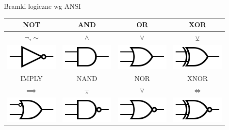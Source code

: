 \begin{frame}{Bramki logiczne wg ANSI}
    \begin{table}
        \centering
        \begin{tabular}{|c|c|c|c|}
            \hline
            NOT & AND & OR & XOR \\
            \hline
            $\lnot$, $\sim$ & $\land$ & $\lor$ & $\veebar$ \\
            \hline
            \includegraphics[width=0.25\textheight]{src/introduction/graphics/gates/NOT_ANSI.png} & 
            \includegraphics[width=0.25\textheight]{src/introduction/graphics/gates/AND_ANSI.png} &
            \includegraphics[width=0.25\textheight]{src/introduction/graphics/gates/OR_ANSI.png} &
            \includegraphics[width=0.25\textheight]{src/introduction/graphics/gates/XOR_ANSI.png} \\
            \hline
            \hline
            IMPLY & NAND & NOR & XNOR \\
            \hline
            $\implies$ & $\barwedge$ & $\barvee$ & $\iff$ \\
            \hline
            \includegraphics[width=0.25\textheight]{src/introduction/graphics/gates/IMPLY_ANSI.png} & 
            \includegraphics[width=0.25\textheight]{src/introduction/graphics/gates/NAND_ANSI.png} &
            \includegraphics[width=0.25\textheight]{src/introduction/graphics/gates/NOR_ANSI.png} &
            \includegraphics[width=0.25\textheight]{src/introduction/graphics/gates/XNOR_ANSI.png} \\
            \hline
        \end{tabular}
    \end{table}
\end{frame}
